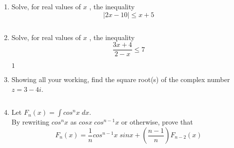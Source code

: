 \clearpage

\begin{enumerate} [leftmargin=0cm] 

\item Solve, for real values of $x$ , the inequality
           \[  \lvert 2x-10 \rvert \leqslant x+5  \]

 

\begin{envAnswer}[blankline=5] $                                                           $ \end{envAnswer}


\item Solve, for real values of $x$ , the inequality
           \[ \frac{3x+4}{2-x} \leqslant 7  \]

 

\begin{envAnswer}[blankline=5] $                                                      1     $ \end{envAnswer}


\item Showing all your working, find the square root(s) of the complex number $z = 3 - 4i$.
\begin{envAnswer}[blankline=5] $                                                           $ \end{envAnswer}

\item Let $F_n(x)=\int cos^nx \; dx$. \\
      By rewriting $cos^nx $ as $cosx \; cos^{n-1}x $ or otherwise, prove that \\
      \[ F_n(x)=\frac{1}{n} cos^{n-1}x \; sinx + \left (\frac{n-1}{n} \right ) F_{n-2}(x) \] \\

            \begin{envAnswer}[blankline=6] $                                                           $ \end{envAnswer}


\end{enumerate}
